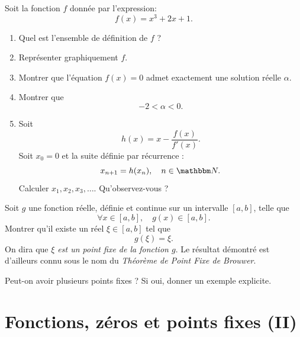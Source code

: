 \begin{exercice}

Soit la fonction $f$ donnée par l'expression:
\[
f(x) = x^3 + 2 x + 1.
\]

\begin{enumerate}

\item Quel est l'ensemble de définition de $f$ ?

\item Représenter graphiquement $f$.

\item Montrer que l'équation $f(x)=0$ admet exactement une solution réelle $\alpha$.

\item Montrer que
\[
-2 < \alpha < 0.
\]

\item Soit 
\[
h(x) = x - \frac{f(x)}{f'(x)}.
\]
Soit $x_0 = 0$ et la suite définie par récurrence :
\[
x_{n+1} = h ( x_n ), \quad n \in \eN.
\]
Calculer $x_1,x_2,x_3,\ldots$. Qu'observez-vous ?

\end{enumerate}

\end{exercice}

\medskip

\begin{exercice}

Soit $g$ une fonction réelle, définie et continue sur un intervalle $[a,b]$, telle que
\[
\forall x \in [a,b],\quad g(x) \in [a,b].
\]
Montrer qu'il existe un réel $\xi \in [a,b]$ tel que 
\[
g(\xi) = \xi.
\]
On dira que \emph{$\xi$ est un point fixe de la fonction $g$}. Le résultat démontré est d'ailleurs connu sous le nom du \emph{Théorème de Point Fixe de Brouwer}.

\medskip

Peut-on avoir plusieurs points fixes ? Si oui, donner un exemple explicite.

\end{exercice}

\newpage

\section{Fonctions, zéros et points fixes (II)}

